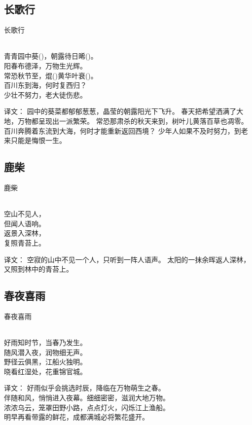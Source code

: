 \subsection{长歌行}

\noindent 长歌行

  \\

\noindent 青青园中葵()，朝露待日晞()。\\
阳春布德泽，万物生光辉。\\
常恐秋节至，焜()黄华叶衰()。\\
百川东到海，何时复西归？\\
少壮不努力，老大徒伤悲。

译文：
园中的葵菜都郁郁葱葱，晶莹的朝露阳光下飞升。
春天把希望洒满了大地，万物都呈现出一派繁荣。
常恐那肃杀的秋天来到，树叶儿黄落百草也凋零。
百川奔腾着东流到大海，何时才能重新返回西境？
少年人如果不及时努力，到老来只能是悔恨一生。

\subsection{鹿柴}

\noindent 鹿柴

  \\

\noindent 空山不见人，\\但闻人语响。\\
返景入深林，\\复照青苔上。

译文：
空寂的山中不见一个人，只听到一阵人语声。
太阳的一抹余晖返人深林，又照到林中的青苔上。

\subsection{春夜喜雨}

\noindent 春夜喜雨

  \\

\noindent 好雨知时节，当春乃发生。\\
随风潜入夜，润物细无声。\\
野径云俱黑，江船火独明。\\
晓看红湿处，花重锦官城。

译文：
好雨似乎会挑选时辰，降临在万物萌生之春。\\
伴随和风，悄悄进入夜幕。细细密密，滋润大地万物。\\
浓浓乌云，笼罩田野小路，点点灯火，闪烁江上渔船。\\
明早再看带露的鲜花，成都满城必将繁花盛开。

